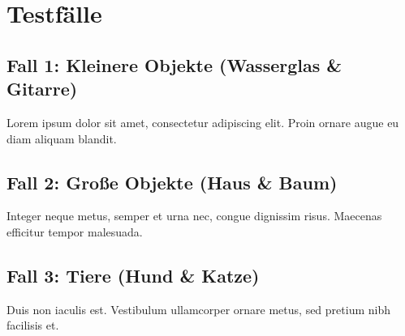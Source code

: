 
\chapter{Testfälle}

\section{Fall 1: Kleinere Objekte (Wasserglas \& Gitarre)}
Lorem ipsum dolor sit amet, consectetur adipiscing elit.
Proin ornare augue eu diam aliquam blandit.
\section{Fall 2: Große Objekte (Haus \& Baum)}
Integer neque metus, semper et urna nec, congue dignissim risus.
Maecenas efficitur tempor malesuada.
\section{Fall 3: Tiere (Hund \& Katze)}
Duis non iaculis est.
Vestibulum ullamcorper ornare metus, sed pretium nibh facilisis et.
